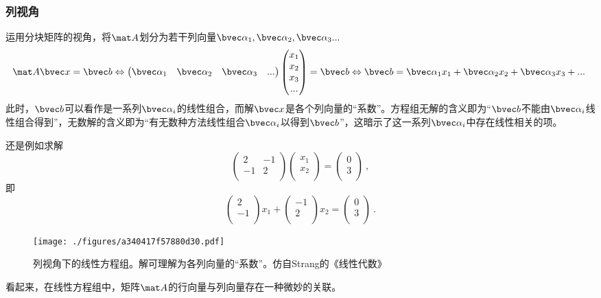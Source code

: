 \subsubsection{列视角}
运用分块矩阵的视角，将$\mat A$划分为若干列向量$\bvec \alpha_1, \bvec \alpha_2,\bvec \alpha_3...$
$$
\mat A \bvec x=\bvec b \Leftrightarrow 
\begin{pmatrix}
\bvec \alpha_1& \bvec \alpha_2& \bvec \alpha_3&...
\end{pmatrix}
\begin{pmatrix}
x_{1}\\
x_{2}\\
x_{3}\\
...\\
\end{pmatrix}
=
\bvec b
\Leftrightarrow 
\bvec b = \bvec \alpha_1 x_1+\bvec \alpha_2 x_2+\bvec \alpha_3 x_3+...~
$$
此时，$\bvec b$可以看作是一系列$\bvec \alpha_i$的线性组合，而解$\bvec x$是各个列向量的“系数”。方程组无解的含义即为“$\bvec b$不能由$\bvec \alpha_i$线性组合得到”，无数解的含义即为“有无数种方法线性组合$\bvec \alpha_i$以得到$\bvec b$”，这暗示了这一系列$\bvec \alpha_i$中存在线性相关的项。

\begin{example}{}
还是例如求解
$$
\begin{pmatrix}
2&-1\\
-1&2\\
\end{pmatrix}
\begin{pmatrix}
x_1\\
x_2\\
\end{pmatrix}
=
\begin{pmatrix}
0\\
3\\
\end{pmatrix}~,
$$
即
$$
\begin{pmatrix}
2\\
-1\\
\end{pmatrix}
x_1
+
\begin{pmatrix}
-1\\
2\\
\end{pmatrix}
x_2
=
\begin{pmatrix}
0\\
3\\
\end{pmatrix}~.
$$
\begin{figure}[ht]
\centering
\texttt{[image: ./figures/a340417f57880d30.pdf]}
\caption{列视角下的线性方程组。解可理解为各列向量的“系数”。仿自Strang的《线性代数》} \label{fig_LinEq_4}
\end{figure}
\end{example}
看起来，在线性方程组中，矩阵$\mat A$的行向量与列向量存在一种微妙的关联。


